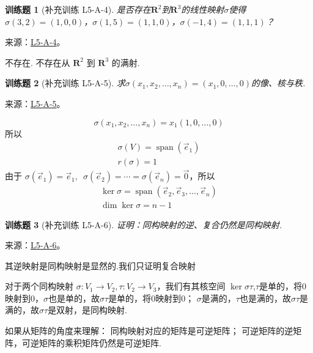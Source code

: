 \documentclass[12pt,fontset=fandol]{ctexart}
\newtheorem{exercise}{训练题}[section]
\begin{document}
\begin{exercise}[补充训练 L5-A-4]\label{prob:L5-A-4}
是否存在$\mathbf{R}^2$到$\mathbf{R}^3$的线性映射$\sigma$使得$\sigma(3,2)=(1,0,0)$，$\sigma(1,5)=(1,1,0)$，$\sigma(-1,4)=(1,1,1)$？
\end{exercise}
\noindent 来源：\href{https://github.com/yhwu-is/Linear-Algebra-Left-Undone/blob/new/%E8%AE%B2%E4%B9%89/%E4%B8%93%E9%A2%98/5%20%E7%BA%BF%E6%80%A7%E6%98%A0%E5%B0%84.tex}{L5-A-4}。
\begin{solve}
不存在. 不存在从 $ \mathbf{R}^2 $ 到 $ \mathbf{R}^3 $ 的满射.
\end{solve}

\begin{exercise}[补充训练 L5-A-5]\label{prob:L5-A-5}
求$\sigma(x_1,x_2,\ldots,x_n)=(x_1,0,\ldots,0)$的像、核与秩.
\end{exercise}
\noindent 来源：\href{https://github.com/yhwu-is/Linear-Algebra-Left-Undone/blob/new/%E8%AE%B2%E4%B9%89/%E4%B8%93%E9%A2%98/5%20%E7%BA%BF%E6%80%A7%E6%98%A0%E5%B0%84.tex}{L5-A-5}。
\begin{solve}
\[ \sigma(x_1, x_2, \ldots, x_n) = x_1(1, 0, \ldots, 0) \]
          所以
          \begin{gather*}
              \sigma(V) = \operatorname{span}(\vec{e}_1) \\
              r(\sigma) = 1
          \end{gather*}
          由于 $ \sigma(\vec{e}_1) = \vec{e}_1,\enspace \sigma(\vec{e}_2) = \cdots = \sigma(\vec{e}_n) = \vec{0} $，所以
          \begin{gather*}
              \ker \sigma = \operatorname{span}(\vec{e}_2, \vec{e}_3, \ldots, \vec{e}_n) \\
              \dim \ker \sigma = n - 1
          \end{gather*}
\end{solve}

\begin{exercise}[补充训练 L5-A-6]\label{prob:L5-A-6}
证明：同构映射的逆、复合仍然是同构映射.
\end{exercise}
\noindent 来源：\href{https://github.com/yhwu-is/Linear-Algebra-Left-Undone/blob/new/%E8%AE%B2%E4%B9%89/%E4%B8%93%E9%A2%98/5%20%E7%BA%BF%E6%80%A7%E6%98%A0%E5%B0%84.tex}{L5-A-6}。
\begin{solve}
其逆映射是同构映射是显然的.我们只证明复合映射

            对于两个同构映射 $\sigma: V_1 \to V_2, \tau: V_2 \to V_3$，我们有其核空间
            $\ker \sigma \tau$,$\tau$是单的，将$0$映射到$0$，$\sigma$也是单的，故$\sigma\tau$是单的，将$0$映射到$0$；
            $\sigma$是满的，$\tau$也是满的，故$\sigma\tau$是满的，故$\sigma\tau$是双射，是同构映射.


            如果从矩阵的角度来理解：
            同构映射对应的矩阵是可逆矩阵；
            可逆矩阵的逆矩阵，可逆矩阵的乘积矩阵仍然是可逆矩阵.
\end{solve}
\end{document}
